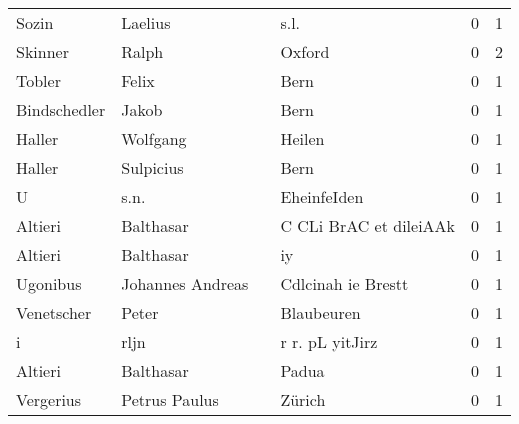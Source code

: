 \begin{tabular}{llllrr}
                    Sozin &                            Laelius &             &                                        s.l. &          0 &         1 \\
                  Skinner &                              Ralph &             &                                      Oxford &          0 &         2 \\
                   Tobler &                              Felix &             &                                        Bern &          0 &         1 \\
             Bindschedler &                              Jakob &             &                                        Bern &          0 &         1 \\
                   Haller &                           Wolfgang &             &                                      Heilen &          0 &         1 \\
                   Haller &                          Sulpicius &             &                                        Bern &          0 &         1 \\
                        U &                               s.n. &             &                                 EheinfeIden &          0 &         1 \\
                  Altieri &                          Balthasar &             &                      C CLi BrAC et dileiAAk &          0 &         1 \\
                  Altieri &                          Balthasar &             &                                          iy &          0 &         1 \\
                 Ugonibus &                   Johannes Andreas &             &                          Cdlcinah ie Brestt &          0 &         1 \\
               Venetscher &                              Peter &             &                                  Blaubeuren &          0 &         1 \\
                        i &                               rljn &             &                             r r. pL yitJirz &          0 &         1 \\
                  Altieri &                          Balthasar &             &                                       Padua &          0 &         1 \\
                Vergerius &                      Petrus Paulus &             &                                      Zürich &          0 &         1 \\

\end{tabular}
